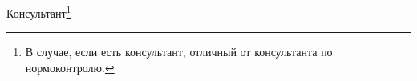 \intervalS%

\noindent Консультант\footnote{В случае, если есть консультант, отличный от консультанта по нормоконтролю.}  \uline{\hspace*{0.1\textheight}\ConsultantExtra}



\vspace{4mm plus2fill}%






